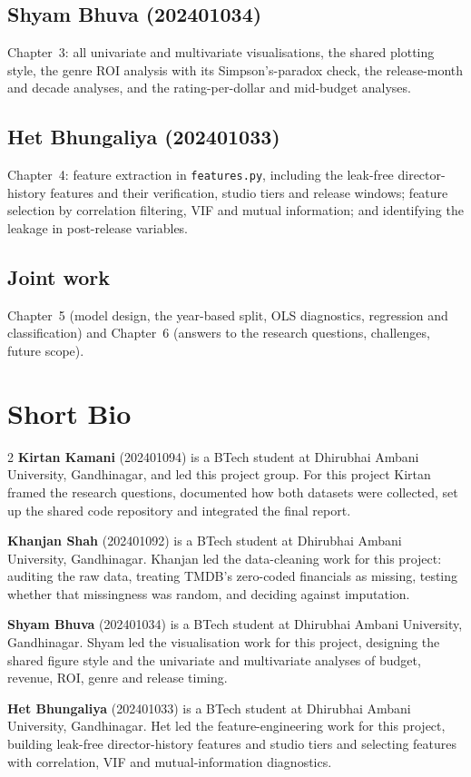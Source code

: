 \documentclass[a4paper,12pt]{report}
\newcommand{\code}[1]{\texttt{#1}}
\begin{document}
\section*{Shyam Bhuva (202401034)}
Chapter~3: all univariate and multivariate visualisations, the shared plotting style, the genre ROI analysis with its Simpson's-paradox check, the release-month and decade analyses, and the rating-per-dollar and mid-budget analyses.

\section*{Het Bhungaliya (202401033)}
Chapter~4: feature extraction in \code{features.py}, including the leak-free director-history features and their verification, studio tiers and release windows; feature selection by correlation filtering, VIF and mutual information; and identifying the leakage in post-release variables.

\section*{Joint work}
Chapter~5 (model design, the year-based split, OLS diagnostics, regression and classification) and Chapter~6 (answers to the research questions, challenges, future scope).

\chapter*{Short Bio}
\begin{multicols}{2}
\textbf{Kirtan Kamani} (202401094) is a BTech student at Dhirubhai Ambani University, Gandhinagar, and led this project group. For this project Kirtan framed the research questions, documented how both datasets were collected, set up the shared code repository and integrated the final report.

\medskip
\textbf{Khanjan Shah} (202401092) is a BTech student at Dhirubhai Ambani University, Gandhinagar. Khanjan led the data-cleaning work for this project: auditing the raw data, treating TMDB's zero-coded financials as missing, testing whether that missingness was random, and deciding against imputation.

\medskip
\textbf{Shyam Bhuva} (202401034) is a BTech student at Dhirubhai Ambani University, Gandhinagar. Shyam led the visualisation work for this project, designing the shared figure style and the univariate and multivariate analyses of budget, revenue, ROI, genre and release timing.

\medskip
\textbf{Het Bhungaliya} (202401033) is a BTech student at Dhirubhai Ambani University, Gandhinagar. Het led the feature-engineering work for this project, building leak-free director-history features and studio tiers and selecting features with correlation, VIF and mutual-information diagnostics.
\end{multicols}
\end{document}
